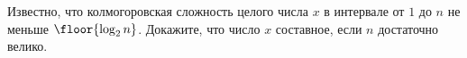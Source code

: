 Известно, что колмогоровская сложность целого числа $x$ в интервале от $1$ до $n$ не меньше
$\floor{\log_2 n}$. Докажите, что число $x$ составное, если $n$ достаточно велико.
